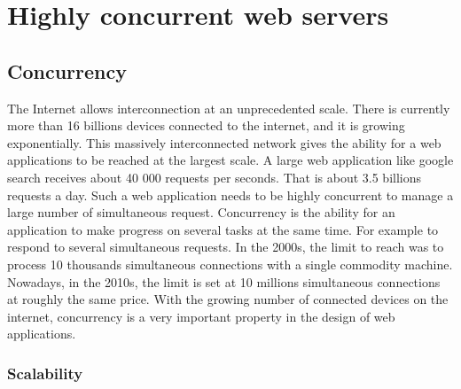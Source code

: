 \section{Highly concurrent web servers}


\subsection{Concurrency}

The Internet allows interconnection at an unprecedented scale.
There is currently more than 16 billions devices connected to the internet, and it is growing exponentially.
This massively interconnected network gives the ability for a web applications to be reached at the largest scale.
A large web application like google search receives about 40 000 requests per seconds.
That is about 3.5 billions requests a day.
Such a web application needs to be highly concurrent to manage a large number of simultaneous request.
Concurrency is the ability for an application to make progress on several tasks at the same time.
For example to respond to several simultaneous requests.
In the 2000s, the limit to reach was to process 10 thousands simultaneous connections with a single commodity machine.
Nowadays, in the 2010s, the limit is set at 10 millions simultaneous connections at roughly the same price.
With the growing number of connected devices on the internet, concurrency is a very important property in the design of web applications.

\subsubsection{Scalability}

